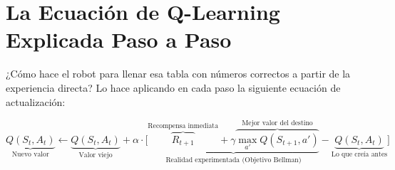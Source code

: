 \section{La Ecuación de Q-Learning Explicada Paso a Paso}
¿Cómo hace el robot para llenar esa tabla con números correctos a partir de la experiencia directa? Lo hace aplicando en cada paso la siguiente ecuación de actualización:

\begin{equation}
  \label{eq:q_learning_intuitive}
  \underbrace{Q(S_t, A_t)}_{\text{Nuevo valor}} \leftarrow \underbrace{Q(S_t, A_t)}_{\text{Valor viejo}} + \alpha \cdot \Big[ \underbrace{\overbrace{R_{t+1}}^{\text{Recompensa inmediata}} + \gamma \overbrace{\max_{a'} Q(S_{t+1}, a')}^{\text{Mejor valor del destino}}}_{\text{Realidad experimentada (Objetivo Bellman)}} - \underbrace{Q(S_t, A_t)}_{\text{Lo que creía antes}} \Big]
\end{equation}

